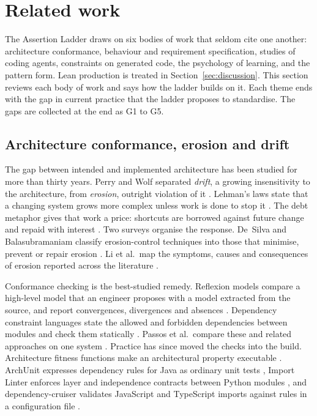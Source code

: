 \section{Related work}\label{sec:related}

The Assertion Ladder draws on six bodies of work that seldom cite one another: architecture
conformance, behaviour and requirement specification, studies of coding agents, constraints on
generated code, the psychology of learning, and the pattern form. Lean production is treated in
Section~\ref{sec:discussion}. This section reviews each body of work and says how the ladder builds
on it. Each theme ends with the gap in current practice that the ladder proposes to standardise.
The gaps are collected at the end as G1 to G5.

\subsection{Architecture conformance, erosion and drift}

The gap between intended and implemented architecture has been studied for more than thirty
years. Perry and Wolf separated \emph{drift}, a growing insensitivity to the architecture, from
\emph{erosion}, outright violation of it \citep{perry1992foundations}. Lehman's laws state that a
changing system grows more complex unless work is done to stop it \citep{lehman1980laws}. The
debt metaphor gives that work a price: shortcuts are borrowed against future change and repaid
with interest \citep{cunningham1992wycash,kruchten2012debt}. Two surveys organise the response.
De~Silva and Balasubramaniam classify erosion-control techniques into those that minimise,
prevent or repair erosion \citep{desilva2012erosion}. Li et al.\ map the symptoms, causes and
consequences of erosion reported across the literature \citep{li2022erosion}.

Conformance checking is the best-studied remedy. Reflexion models compare a high-level model
that an engineer proposes with a model extracted from the source, and report convergences,
divergences and absences \citep{murphy2001reflexion}. Dependency constraint languages state the
allowed and forbidden dependencies between modules and check them statically
\citep{terra2009dcl}. Passos et al.\ compare these and related approaches on one system
\citep{passos2010conformance}. Practice has since moved the checks into the build. Architecture
fitness functions make an architectural property executable \citep{ford2017evolutionary}.
ArchUnit expresses dependency rules for Java as ordinary unit tests \citep{archunit}, Import
Linter enforces layer and independence contracts between Python modules \citep{importlinter},
and dependency-cruiser validates JavaScript and TypeScript imports against rules in a
configuration file \citep{dependencycruiser}.

